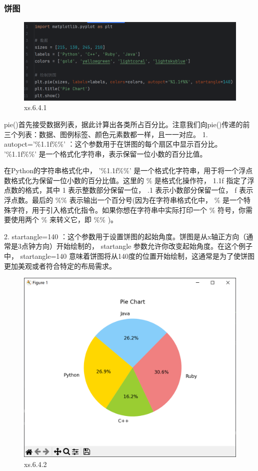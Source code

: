 \documentclass[12pt]{article}
\begin{document}
\subsubsection{饼图}
\begin{figure}[H]
    \centering
    \includegraphics[width=1\linewidth]{饼图 program1.png}
    \caption{xs.6.4.1}
    \label{fig:enter-label}
\end{figure}
pie()首先接受数据列表，据此计算出各类所占百分比。注意我们向pie()传递的前三个列表：数据、图例标签、颜色元素数都一样，且一一对应。
\label{格式化字符串表示保留小数位}
1. autopct='\%1.1f\%\%'   ：这个参数用于在饼图的每个扇区中显示百分比。  '\%1.1f\%\%'  是一个格式化字符串，表示保留一位小数的百分比值。

在Python的字符串格式化中，  '\%1.1f\%\%'   是一个格式化字符串，用于将一个浮点数格式化为保留一位小数的百分比值。这里的   \%   是格式化操作符，  1.1f   指定了浮点数的格式，其中   1   表示整数部分保留一位，  .1   表示小数部分保留一位，  f   表示浮点数。最后的   \%\%   表示输出一个百分号(因为在字符串格式化中，  \%   是一个特殊字符，用于引入格式化指令。如果你想在字符串中实际打印一个   \%   符号，你需要使用两个   \%   来转义它，即   \%\%  )。

2. startangle=140  ：这个参数用于设置饼图的起始角度。饼图是从x轴正方向（通常是3点钟方向）开始绘制的，  startangle  参数允许你改变起始角度。在这个例子中，  startangle=140  意味着饼图将从140度的位置开始绘制，这通常是为了使饼图更加美观或者符合特定的布局需求。

\begin{figure}[H]
    \centering
    \includegraphics[width=0.8\linewidth]{饼图 Pic1.png}
    \caption{xs.6.4.2}
    \label{fig:enter-label}
\end{figure}
\end{document}
